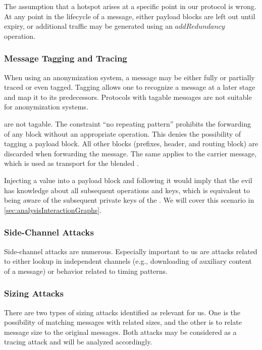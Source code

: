 The assumption that a hotspot arises at a specific point in our protocol is wrong. At any point in the lifecycle of a message, either payload blocks are left out until expiry, or additional traffic may be generated using an $addRedundancy$ operation.

\subsubsection{Message Tagging and Tracing}
When using an anonymization system, a message may be either fully or partially traced or even tagged. Tagging allows one to recognize a message at a later stage and map it to its predecessors. Protocols with tagable messages are not suitable for anonymization systems.

\VortexMessages{} are not tagable. The constraint ``no repeating pattern'' prohibits the forwarding of any block without an appropriate operation. This denies the possibility of tagging a payload block. All other blocks (prefixes, header, and routing block) are discarded when forwarding the message. The same applies to the carrier message, which is used as transport for the blended \VortexMessage.

Injecting a value into a payload block and following it would imply that the evil \VortexNode{} has knowledge about all subsequent operations and keys, which is equivalent to being aware of the subsequent private keys of the \VortexNodes. We will cover this scenario in \cref{sec:analysisInteractionGraphs}.

\subsubsection{Side-Channel Attacks}
Side-channel attacks are numerous. Especially important to us are attacks related to either lookup in independent channels (e.g., downloading of auxiliary content of a message) or behavior related to timing patterns.

\subsubsection{Sizing Attacks}
There are two types of sizing attacks identified as relevant for us. One is the possibility of matching messages with related sizes, and the other is to relate message size to the original messages. Both attacks may be considered as a tracing attack and will be analyzed accordingly. 

